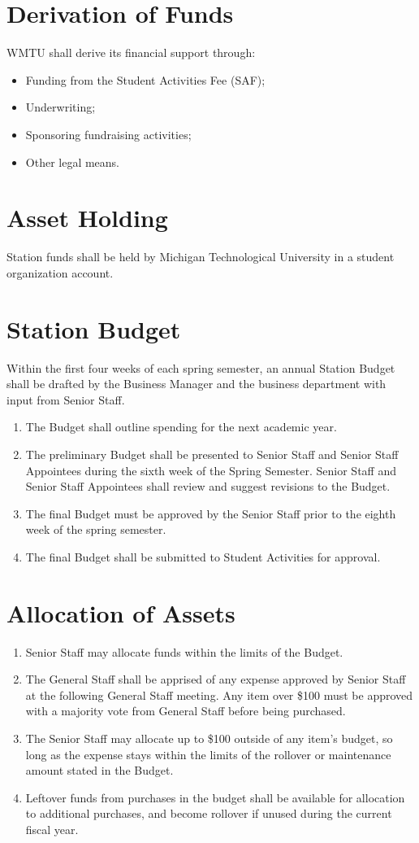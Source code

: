 \documentclass[12pt]{constitution}
\begin{document}


\section{​Derivation of Funds}
WMTU shall derive its financial support through:
\begin{itemize}
\item Funding from the Student Activities Fee (SAF);
\item Underwriting;
\item Sponsoring fundraising activities;
\item Other legal means.
\end{itemize}


\section{​Asset Holding}
Station funds shall be held by Michigan Technological University in a student organization account.


\section{​Station Budget}
Within the first four weeks of each spring semester, an annual Station Budget shall be drafted by the Business Manager and the business department with input from Senior Staff.
\begin{enumerate}
\item The Budget shall outline spending for the next academic year.
\item The preliminary Budget shall be presented to Senior Staff and Senior Staff Appointees during the sixth week of the Spring Semester. Senior Staff and Senior Staff Appointees shall review and suggest revisions to the Budget.
\item The final Budget must be approved by the Senior Staff prior to the eighth week of the spring semester.
\item The final Budget shall be submitted to Student Activities for approval.
\end{enumerate}


\section{​Allocation of Assets}
\begin{enumerate}
\item Senior Staff may allocate funds within the limits of the Budget.
\item The General Staff shall be apprised of any expense approved by Senior Staff at the following General Staff meeting. Any item over \$100 must be approved with a majority vote from General Staff before being purchased.
\item The Senior Staff may allocate up to \$100 outside of any item's budget, so long as the expense stays within the limits of the rollover or maintenance amount stated in the Budget.
\item Leftover funds from purchases in the budget shall be available for allocation to additional purchases, and become rollover if unused during the current fiscal year.
\end{enumerate}
\end{document}
